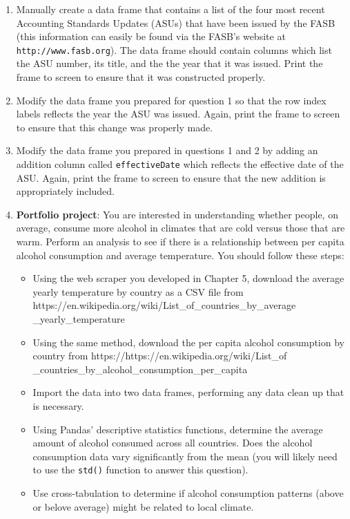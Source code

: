 \documentclass{book}
\begin{document}
\begin{enumerate}
	\item Manually create a data frame that contains a list of the four most recent Accounting Standards Updates (ASUs) that have been issued by the FASB (this information can easily be found via the FASB's website at \texttt{http://www.fasb.org}). The data frame should contain columns which list the ASU number, its title, and the the year that it was issued. Print the frame to screen to ensure that it was constructed properly.
	\item Modify the data frame you prepared for question 1 so that the row index labels reflects the year the ASU was issued. Again, print the frame to screen to ensure that this change was properly made.
	\item Modify the data frame you prepared in questions 1 and 2 by adding an addition column called \texttt{effectiveDate} which reflects the effective date of the ASU. Again, print the frame to screen to ensure that the new addition is appropriately included.
	\item \textbf{Portfolio project}:  You are interested in understanding whether people, on average, consume more alcohol in climates that are cold versus those that are warm. Perform an analysis to see if there is a relationship between per capita alcohol consumption and average temperature. You should follow these steps:
\begin{itemize}
	\item Using the web scraper you developed in Chapter 5, download the average yearly temperature by country as a CSV file from \\
	https://en.wikipedia.org/wiki/List\_of\_countries\_by\_average\\ \_yearly\_temperature
	\item Using the same method, download the per capita alcohol consumption by country from https://https://en.wikipedia.org/wiki/List\_of
	\_countries\_by\_alcohol\_consumption\_per\_capita
	\item Import the data into two data frames, performing any data clean up that is necessary.
	\item Using Pandas' descriptive statistics functions, determine the average amount of alcohol consumed across all countries. Does the alcohol consumption data vary significantly from the mean (you will likely need to use the \texttt{std()} function to answer this question).
	\item Use cross-tabulation to determine if alcohol consumption patterns (above or belove average) might be related to local climate.
\end{itemize}
\end{enumerate}
\end{document}
